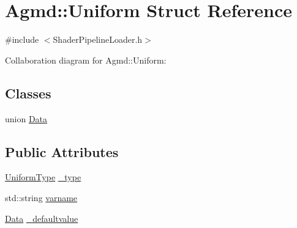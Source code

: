 \hypertarget{struct_agmd_1_1_uniform}{\section{Agmd\+:\+:Uniform Struct Reference}
\label{struct_agmd_1_1_uniform}
}


{\ttfamily \#include $<$Shader\+Pipeline\+Loader.\+h$>$}



Collaboration diagram for Agmd\+:\+:Uniform\+:
\subsection*{Classes}
\begin{DoxyCompactItemize}
\item 
union \hyperlink{union_agmd_1_1_uniform_1_1_data}{Data}
\end{DoxyCompactItemize}
\subsection*{Public Attributes}
\begin{DoxyCompactItemize}
\item 
\hyperlink{namespace_agmd_a3d4304962f298f9f7b89bfc880959c4a}{Uniform\+Type} \hyperlink{struct_agmd_1_1_uniform_ad4070c0c634a0e3ced8272165dc4a1d4}{\+\_\+type}
\item 
std\+::string \hyperlink{struct_agmd_1_1_uniform_a279f442125b88f35673cf735f7795381}{varname}
\item 
\hyperlink{union_agmd_1_1_uniform_1_1_data}{Data} \hyperlink{struct_agmd_1_1_uniform_a4256fb764fb19c54f5591e928dce21e4}{\+\_\+defaultvalue}
\end{DoxyCompactItemize}


